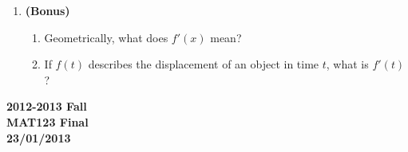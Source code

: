 \documentclass[a4paper, 12pt]{article}
\begin{document}
\begin{enumerate}[leftmargin=*,label=\textbf{\arabic*.}]
\begin{enumerate}[leftmargin=*,label=\textbf{\alph*.}]
\item Use the Ratio Test to determine if the series $\displaystyle\sum_{n=1}^\infty\frac{n!}{ e^{2n}}$ converges or diverges.

\item Use the Integral Test to determine if the series $\displaystyle\sum_{n=1}^\infty\frac n{ e^{n^2}}$ converges or diverges. Be sure to check that the conditions of the integral test are satisfied.
\end{enumerate}

\item \textbf{(Bonus)}
\begin{enumerate}[leftmargin=*,label=\textbf{\alph*.}]
\item Geometrically, what does $f'(x)$ mean?
\item If $f(t)$ describes the displacement of an object in time $t$, what is $f'(t)$?
\end{enumerate}
\end{enumerate}

\newpage
{}
{}

\begin{center}
\textbf{2012-2013 Fall \\MAT123 Final\\23/01/2013}
\end{center}
\end{document}

